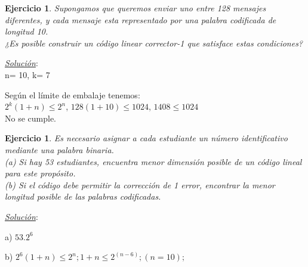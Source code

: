 \documentclass{beamer}
\theoremstyle{plain}
\theoremstyle{example}
\newtheorem{ejercicio} [Ejercicio]{Ejercicio}
\theoremstyle{example}
\begin{document}

\begin{frame}  \small \begin{ejercicio} 

Supongamos que queremos enviar uno entre 128 mensajes diferentes, y cada mensaje esta representado por una palabra codificada de longitud 10.\\
\vspace{0.1cm}
¿Es posible construir un código linear corrector-1 que satisface estas condiciones?

\end{ejercicio} %
\textit{\underline{Solución}}:\\ 
\vspace{0.3cm}
n= 10, k= 7\\

\vspace{0.1cm}

Según el límite de embalaje tenemos:\\
\vspace{0.1cm}
$2^k (1+n) \leq 2^n$, $128 (1+10) \leq 1024$, $1408 \leq 1024$\\
\vspace{0.1cm}
No se cumple.

\end{frame} 


\begin{frame}  \small \begin{ejercicio} 

Es necesario asignar a cada estudiante un número identificativo mediante una palabra binaria.\\

(a) Si hay 53 estudiantes, encuentra menor dimensión posible de un código lineal para este propósito.\\ 

(b) Si el código debe permitir la corrección de 1 error, encontrar la menor longitud posible de las palabras codificadas.


\end{ejercicio} %
\textit{\underline{Solución}}:\\ 
\vspace{0.3cm}

a) $53. 2^6$

b) $2^6 (1+n) \leq 2^n; 1+n \leq 2^{(n-6)};   (n=10); $
\end{frame} 
\end{document}
